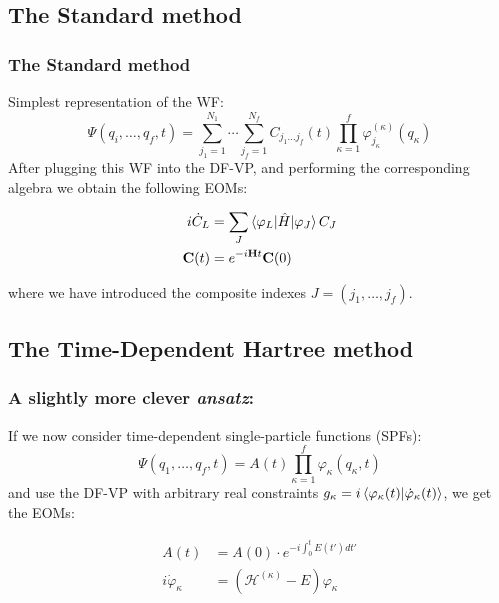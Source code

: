 \documentclass{beamer}
\begin{document}
\subsection{The Standard method}
\label{stdmeth}
\begin{frame}
  \frametitle{The Standard method}
  Simplest representation of the WF:
\begin{equation}
	\Psi(q_i,\ldots, q_f, t) = \sum_{j_1=1}^{N_1}\cdots\sum_{j_f=1}^{N_f} C_{j_1\ldots j_f}(t)\prod_{\kappa=1}^f\varphi^{(\kappa)}_{j_{\kappa}}(q_{\kappa})
	\label{stme}
\end{equation}
After plugging this WF into the DF-VP, and performing the corresponding algebra we obtain
the following EOMs:
\begin{block}{}
\begin{align}
\begin{split}
	i\dot{C}_L &= \sum_J \braket{\varphi_L|\hat{H}|\varphi_J}C_J \\
	\mathbf{C}(t) &= e^{-i\mathbf{H}t}\mathbf{C}(0)
\end{split}
\end{align}
\end{block}
where we have introduced the composite indexes \(J = (j_1,\ldots,j_f)\).

\end{frame}

\subsection{The Time-Dependent Hartree method}
\label{tdh}

\begin{frame}
  \frametitle{A slightly more clever \emph{ansatz}:}
  \justifying{}
  If we now consider time-dependent single-particle functions (SPFs):
\begin{equation}
\Psi(q_1,\ldots, q_f, t) = A(t)\prod^f_{\kappa=1}\varphi_{\kappa}(q_{\kappa}, t)
\end{equation}
and use the DF-VP with arbitrary real constraints \(g_{\kappa} = i\braket{\varphi_{\kappa}(t)|\dot{\varphi}_{\kappa}(t)}\), we get the EOMs:

\begin{block}{}
  \begin{equation}
    \begin{split}
      A(t) &= A(0) \cdot e^{-i\int_0^t E(t')dt'} \\
      i\dot{\varphi}_{\kappa} &= (\mathcal{H}^{(\kappa)} - E)\varphi_{\kappa}
    \end{split}
  \end{equation}
\end{block}
\end{frame}
\end{document}
